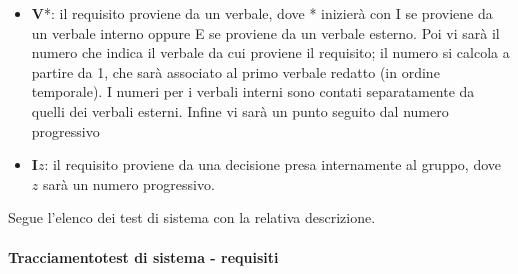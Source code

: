\begin{itemize}
\begin{itemize}
        \item \textbf{V}*: il requisito proviene da un verbale, dove * inizierà con I se proviene da un verbale interno oppure E se proviene da un verbale esterno.
        Poi vi sarà il numero che indica il verbale da cui proviene il requisito; il numero si calcola a partire da 1, che sarà associato al primo verbale redatto (in ordine temporale). I numeri per i verbali interni sono contati separatamente da quelli dei verbali esterni. Infine vi sarà un punto seguito dal numero progressivo
        \item \textbf{I}$z$: il requisito proviene da una decisione presa internamente al gruppo, dove $z$ sarà un numero progressivo.
    \end{itemize}
\end{itemize}

Segue l'elenco dei test di sistema con la relativa descrizione.



\paragraph{Tracciamentotest di sistema - requisiti}
